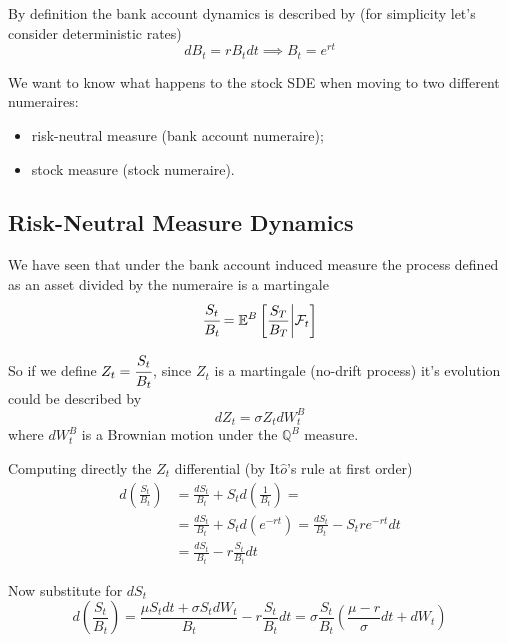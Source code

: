 \documentclass[12pt,a4paper]{article}
\begin{document}
By definition the bank account dynamics is described by (for simplicity let's consider deterministic rates)
\begin{equation*}
dB_t = rB_tdt\implies B_t = e^{rt}
\end{equation*}

We want to know what happens to the stock SDE when moving to two different numeraires:
\begin{itemize}
\item risk-neutral measure (bank account numeraire);
\item stock measure (stock numeraire).
\end{itemize}

\subsection{Risk-Neutral Measure Dynamics}
We have seen that under the bank account induced measure the process defined as an asset divided by the numeraire is a martingale
\begin{equation*}
\cfrac{S_t}{B_t} = \mathbb{E}^{B}\left[\frac{S_T}{B_T}\bigg|\mathcal{F}_t\right]
\end{equation*}

So if we define $Z_t=\cfrac{S_t}{B_t}$, since $Z_t$ is a martingale (no-drift process) it's evolution could be described by
\begin{equation}
dZ_t = \sigma Z_t dW_t^B
\label{eq:z_martingale1}
\end{equation}
where $dW_t^B$ is a Brownian motion under the $\mathbb{Q}^B$ measure.

Computing directly the $Z_t$ differential (by It$\hat{o}$'s rule at first order)
\begin{equation*}
\begin{aligned}
d\left(\frac{S_t}{B_t}\right) &= \frac{dS_t}{B_t} + S_t d\left(\frac{1}{B_t}\right) = \\ 
&=\frac{dS_t}{B_t} + S_t d\left(e^{-rt}\right) = \frac{dS_t}{B_t} - S_t re^{-rt}dt \\
&= \frac{dS_t}{B_t} - r\frac{S_t}{B_t}dt 
\end{aligned}
\end{equation*}

Now substitute for $dS_t$
\begin{equation*}
d\left(\frac{S_t}{B_t}\right)= \frac{ \mu S_t dt + \sigma S_t dW_t}{B_t} - r\frac{S_t}{B_t}dt = \sigma\frac{S_t}{B_t}\left(\frac{\mu - r}{\sigma}dt + dW_t \right)
\end{equation*}	
\end{document}
